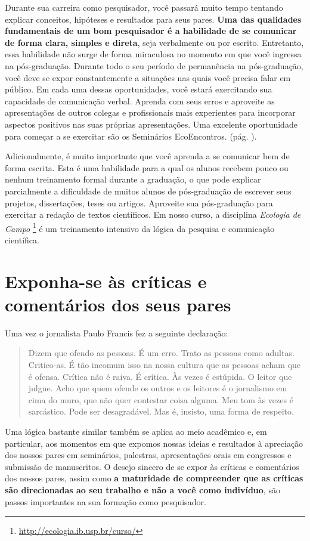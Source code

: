 \documentclass[twoside a4paper 12pt]{report}
\begin{document}
Durante sua carreira como pesquisador, você passará muito tempo
tentando explicar conceitos, hipóteses e resultados para seus
pares. \textbf{Uma das qualidades fundamentais de um bom pesquisador é
  a habilidade de se comunicar de forma clara, simples e direta}, seja
verbalmente ou por escrito. Entretanto, essa habilidade não surge de
forma miraculosa no momento em que você ingressa na
pós-graduação. Durante todo o seu período de permanência na
pós-graduação, você deve se expor constantemente a situações nas quais
você precisa falar em público. Em cada uma dessas oportunidades, você
estará exercitando sua capacidade de comunicação verbal. Aprenda com
seus erros e aproveite as apresentações de outros colegas e
profissionais mais experientes para incorporar aspectos positivos nas
suas próprias apresentações. Uma excelente oportunidade para começar a
se exercitar são os Seminários
EcoEncontros. (pág. \pageref{subsec:seminarios}).

Adicionalmente, é muito importante que você aprenda a se comunicar bem
de forma escrita. Esta é uma habilidade para a qual os alunos recebem
pouco ou nenhum treinamento formal durante a graduação, o que pode
explicar parcialmente a dificuldade de muitos alunos de pós-graduação
de escrever seus projetos, dissertações, teses ou artigos. Aproveite
sua pós-graduação para exercitar a redação de textos científicos. Em
nosso curso, a disciplina \emph{Ecologia de Campo}
\footnote{\url{http://ecologia.ib.usp.br/curso/}} é um treinamento
intensivo da lógica da pesquisa e comunicação científica.

\section{Exponha-se às críticas e comentários dos seus pares}

Uma vez o jornalista Paulo Francis fez a seguinte declaração: 

\begin{quote}
  Dizem que ofendo as pessoas. É um erro. Trato as pessoas como
  adultas. Critico-as. É tão incomum isso na nossa cultura que as
  pessoas acham que é ofensa. Crítica não é raiva.  É crítica. Às
  vezes é estúpida. O leitor que julgue. Acho que quem ofende os
  outros e os leitores é o jornalismo em cima do muro, que não quer
  contestar coisa alguma. Meu tom às vezes é sarcástico. Pode ser
  desagradável. Mas é, insisto, uma forma de respeito.
\end{quote}

Uma lógica bastante similar também se aplica ao meio acadêmico e, em
particular, aos momentos em que expomos nossas ideias e resultados à
apreciação dos nossos pares em seminários, palestras, apresentações
orais em congressos e submissão de manuscritos. O desejo sincero de se
expor às críticas e comentários dos nossos pares, assim como \textbf{a
  maturidade de compreender que as críticas são direcionadas ao seu
  trabalho e não a você como indivíduo}, são passos importantes na sua
formação como pesquisador.
\end{document}
